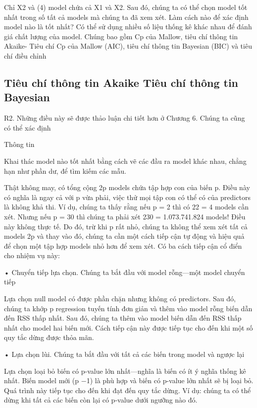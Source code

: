 Chỉ X2 và (4) model chứa cả X1 và X2. Sau đó, chúng ta có thể chọn model tốt nhất trong số tất cả models mà chúng ta đã xem xét. Làm cách nào để xác định model nào là tốt nhất? Có thể sử dụng nhiều số liệu thống kê khác nhau để đánh giá chất lượng của model. Chúng bao gồm Cp của Mallow, tiêu chí thông tin Akaike- Tiêu chí Cp của Mallow (AIC), tiêu chí thông tin Bayesian (BIC) và tiêu chí điều chỉnh

\subsection{Tiêu chí thông tin Akaike Tiêu chí thông tin Bayesian}

R2. Những điều này sẽ được thảo luận chi tiết hơn ở Chương 6. Chúng ta cũng có thể xác định

Thông tin

Khai thác model nào tốt nhất bằng cách vẽ các đầu ra model khác nhau, chẳng hạn như phần dư, để tìm kiếm các mẫu.

Thật không may, có tổng cộng 2p models chứa tập hợp con của biến p. Điều này có nghĩa là ngay cả với p vừa phải, việc thử mọi tập con có thể có của predictors là không khả thi. Ví dụ, chúng ta thấy rằng nếu p = 2 thì có 22 = 4 models cần xét. Nhưng nếu p = 30 thì chúng ta phải xét 230 = 1.073.741.824 models! Điều này không thực tế. Do đó, trừ khi p rất nhỏ, chúng ta không thể xem xét tất cả models 2p và thay vào đó, chúng ta cần một cách tiếp cận tự động và hiệu quả để chọn một tập hợp models nhỏ hơn để xem xét. Có ba cách tiếp cận cổ điển cho nhiệm vụ này:

• Chuyển tiếp lựa chọn. Chúng ta bắt đầu với model rỗng—một model chuyển tiếp

Lựa chọn null model có được phần chặn nhưng không có predictors. Sau đó, chúng ta khớp p regression tuyến tính đơn giản và thêm vào model rỗng biến dẫn đến RSS thấp nhất. Sau đó, chúng ta thêm vào model biến dẫn đến RSS thấp nhất cho model hai biến mới. Cách tiếp cận này được tiếp tục cho đến khi một số quy tắc dừng được thỏa mãn.

• Lựa chọn lùi. Chúng ta bắt đầu với tất cả các biến trong model và ngược lại

Lựa chọn loại bỏ biến có p-value lớn nhất—nghĩa là biến có ít ý nghĩa thống kê nhất. Biến model mới (p −1) là phù hợp và biến có p-value lớn nhất sẽ bị loại bỏ. Quá trình này tiếp tục cho đến khi đạt đến quy tắc dừng. Ví dụ: chúng ta có thể dừng khi tất cả các biến còn lại có p-value dưới ngưỡng nào đó.

